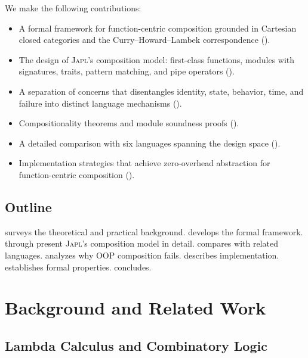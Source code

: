 \documentclass[11pt,a4paper]{article}
\newcommand{\japl}{\textsc{Japl}}
\begin{document}
We make the following contributions:
\begin{itemize}
  \item A formal framework for function-centric composition grounded in Cartesian closed categories and the Curry--Howard--Lambek correspondence ().
  \item The design of \japl{}'s composition model: first-class functions, modules with signatures, traits, pattern matching, and pipe operators ().
  \item A separation of concerns that disentangles identity, state, behavior, time, and failure into distinct language mechanisms ().
  \item Compositionality theorems and module soundness proofs ().
  \item A detailed comparison with six languages spanning the design space ().
  \item Implementation strategies that achieve zero-overhead abstraction for function-centric composition ().
\end{itemize}

\subsection{Outline}

 surveys the theoretical and practical background.  develops the formal framework.  through  present \japl{}'s composition model in detail.  compares with related languages.  analyzes why OOP composition fails.  describes implementation.  establishes formal properties.  concludes.


\section{Background and Related Work}
\label{sec:background}

\subsection{Lambda Calculus and Combinatory Logic}
\end{document}
